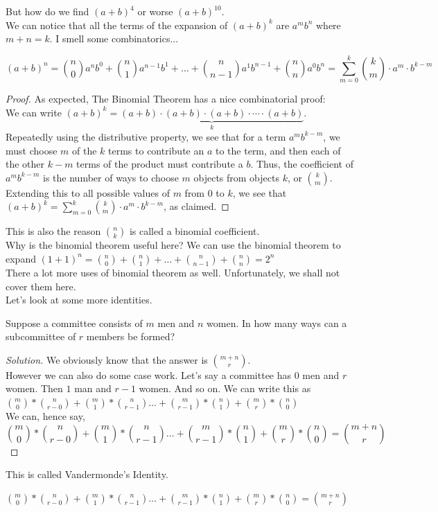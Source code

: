 But how do we find $(a+b)^4$ or worse $(a+b)^{10}$. \\
We can notice that all the terms of the expansion of $(a+b)^k$ are $a^mb^n$ where $m+n=k$. I smell some combinatorics...\\
\begin{theorem}
    \[(a+b)^n = \binom{n}{0}a^{n}b^0+\binom{n}{1}a^{n-1}b^1+\dots+\binom{n}{n-1}a^{1}b^{n-1}+\binom{n}{n}a^{0}b^{n} = \sum_{m=0}^{k}{\binom{k}{m}}\cdot a^m\cdot b^{k-m}\]
\end{theorem}
\begin{proof}
    As expected, The Binomial Theorem has a nice combinatorial proof:\\
We can write $(a+b)^k=\underbrace{ (a+b)\cdot(a+b)\cdot(a+b)\cdot\cdots\cdot(a+b) }_{k}$. Repeatedly using the distributive property, we see that for a term $a^m b^{k-m}$, we must choose $m$ of the $k$ terms to contribute an $a$ to the term, and then each of the other $k-m$ terms of the product must contribute a $b$. Thus, the coefficient of $a^m b^{k-m}$ is the number of ways to choose $m$ objects from objects $k$, or $\binom{k}{m}$. Extending this to all possible values of $m$ from $0$ to $k$, we see that $(a+b)^k = \sum_{m=0}^{k}{\binom{k}{m}}\cdot a^m\cdot b^{k-m}$, as claimed.
\end{proof}
This is also the reason $\binom{n}{k}$ is called a binomial coefficient.\\
Why is the binomial theorem useful here? We can use the binomial theorem to expand $(1+1)^n=\binom{n}{0}+\binom{n}{1}+\dots+\binom{n}{n-1}+\binom{n}{n}=2^n$\\
There a lot more uses of binomial theorem as well. Unfortunately, we shall not cover them here.\\
Let's look at some more identities.\\
\begin{example}
     Suppose a committee consists of $m$ men and $n$ women. In how many ways can a subcommittee of $r$ members be formed?
\end{example}
\begin{proof}
    [Solution]
    We obviously know that the answer is $\binom{m+n}{r}$. \\
    However we can also do some case work. Let's say a committee has $0$ men and $r$ women. Then $1$ man and $r-1$ women. And so on. We can write this as $\binom{m}{0}*\binom{n}{r-0} + \binom{m}{1}*\binom{n}{r-1} \dots +\binom{m}{r-1}*\binom{n}{1}+\binom{m}{r}*\binom{n}{0}$\\
    We can, hence say, 
    \[\binom{m}{0}*\binom{n}{r-0} + \binom{m}{1}*\binom{n}{r-1} \dots +\binom{m}{r-1}*\binom{n}{1}+\binom{m}{r}*\binom{n}{0}=\binom{m+n}{r}\]
    \end{proof}
This is called Vandermonde’s Identity.
\begin{theorem}
    $\binom{m}{0}*\binom{n}{r-0} + \binom{m}{1}*\binom{n}{r-1} \dots +\binom{m}{r-1}*\binom{n}{1}+\binom{m}{r}*\binom{n}{0}=\binom{m+n}{r}$
\end{theorem}
